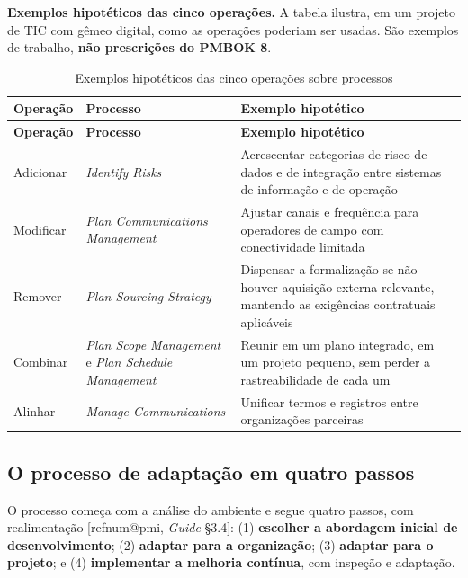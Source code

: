 \documentclass[11pt,a4paper]{article}
\makeatletter
\newcommand{\refnum}[1]{\csname refnum@#1\endcsname}
\newcommand{\SingleSpacing}{}
\newcommand{\fontetab}[1]{\par\vspace{3pt}{\small\noindent Fonte: #1\par}}
\makeatother
\begin{document}
\textbf{Exemplos hipotéticos das cinco operações.} A tabela ilustra, em um projeto de TIC com gêmeo digital, como as operações poderiam ser usadas. São exemplos de trabalho, \textbf{não prescrições do PMBOK 8}.

\begingroup\SingleSpacing\small
\begin{longtable}{@{}>{\raggedright\arraybackslash}p{}>{\raggedright\arraybackslash}p{}>{\raggedright\arraybackslash}p{}@{}}
\caption{Exemplos hipotéticos das cinco operações sobre processos}\label{tab:t10}\\
\toprule
\textbf{Operação} & \textbf{Processo} & \textbf{Exemplo hipotético}\\
\midrule
\endfirsthead
\toprule
\textbf{Operação} & \textbf{Processo} & \textbf{Exemplo hipotético}\\
\midrule
\endhead
\bottomrule
\endfoot
\bottomrule
\endlastfoot
Adicionar & \textit{Identify Risks} & Acrescentar categorias de risco de dados e de integração entre sistemas de informação e de operação\\[3pt]
Modificar & \textit{Plan Communications Management} & Ajustar canais e frequência para operadores de campo com conectividade limitada\\[3pt]
Remover & \textit{Plan Sourcing Strategy} & Dispensar a formalização se não houver aquisição externa relevante, mantendo as exigências contratuais aplicáveis\\[3pt]
Combinar & \textit{Plan Scope Management} e \textit{Plan Schedule Management} & Reunir em um plano integrado, em um projeto pequeno, sem perder a rastreabilidade de cada um\\[3pt]
Alinhar & \textit{Manage Communications} & Unificar termos e registros entre organizações parceiras\\[3pt]
\end{longtable}
\endgroup
\fontetab{Elaborado pelos autores (2026); exemplos ilustrativos, não prescrições do PMBOK 8.}
\subsection{O processo de adaptação em quatro passos}

O processo começa com a análise do ambiente e segue quatro passos, com realimentação [\refnum{pmi}, \textit{Guide} §3.4]: (1) \textbf{escolher a abordagem inicial de desenvolvimento}; (2) \textbf{adaptar para a organização}; (3) \textbf{adaptar para o projeto}; e (4) \textbf{implementar a melhoria contínua}, com inspeção e adaptação.
\end{document}
